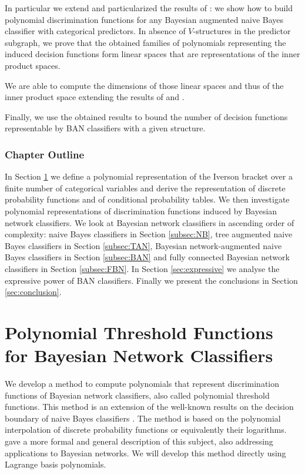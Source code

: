 \documentclass[11pt,a4paper, twoside]{book}
\begin{document}
In particular we extend and particularized the results of \cite{Jaeger03}: we show how to build polynomial discrimination functions for any Bayesian augmented naive Bayes classifier with categorical predictors.  
In absence of $V$-structures in the predictor subgraph, we prove that the obtained families of polynomials representing the induced decision functions form linear spaces that are representations of the inner product spaces.

We are able to compute the dimensions of those linear spaces and thus of the inner product space extending the results of \citet{Nakamura05} and \citet{Yang2012}.

Finally, we use the obtained results to bound the number of decision functions representable by BAN classifiers with a given structure.




\subsubsection{Chapter Outline}
In Section \ref{sec:polthr} we define a polynomial representation of the Iverson bracket \citep{Iverson1962} over a finite number of categorical variables and derive the representation of discrete probability functions and of conditional probability tables. We then investigate polynomial representations of discrimination functions induced by Bayesian network classifiers. We look at Bayesian network classifiers in ascending order of complexity: naive Bayes classifiers in Section \ref{subsec:NB}, tree augmented naive Bayes classifiers in Section \ref{subsec:TAN}, Bayesian network-augmented naive Bayes classifiers in Section \ref{subsec:BAN} and fully connected Bayesian network classifiers in Section \ref{subsec:FBN}.
In Section \ref{sec:expressive} we analyse the expressive power of BAN classifiers.
Finally we present the conclusions in Section \ref{sec:conclusion}. 
 

\section{Polynomial Threshold Functions for Bayesian Network Classifiers}

\label{sec:polthr}
We develop a method to compute polynomials that represent discrimination functions of Bayesian network classifiers, also called polynomial threshold functions. This method is an extension of the well-known results on the decision boundary of naive Bayes classifiers \citep{Minsky61stepstoward,peot}. The method is based on the polynomial interpolation of discrete probability functions or equivalently their logarithms. \citet{pistone2001} gave a more formal and general description of this subject, also addressing applications to Bayesian networks.  
We will develop this method directly using Lagrange basis polynomials.
\end{document}

